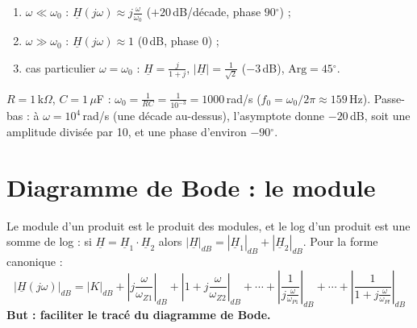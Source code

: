 
\begin{propbox}[title=Asymptotes du passe-haut]
\begin{enumerate}
  \item $\omega\ll\omega_0$ : $\underline H(j\omega)\approx j\frac\omega{\omega_0}$
        ($+20$\,dB/décade, phase $90\ensuremath{^\circ}$) ;
  \item $\omega\gg\omega_0$ : $\underline H(j\omega)\approx 1$ (0\,dB, phase $0$) ;
  \item cas particulier $\omega = \omega_0$ : $\underline H = \frac{j}{1+j}$,
        $|\underline H| = \frac1{\sqrt2}$ ($-3$\,dB), $\mathrm{Arg} = 45\ensuremath{^\circ}$.
\end{enumerate}
\end{propbox}

\begin{exbox}[title={Application numérique (exemple ajouté, pas dans les slides)}]
$R = 1$\,k$\Omega$, $C = 1\,\mu$F : $\omega_0 = \frac1{RC} = \frac1{10^{-3}} = 1000$\,rad/s
($f_0 = \omega_0/2\pi\approx159$\,Hz). Passe-bas : à $\omega = 10^4$\,rad/s (une décade
au-dessus), l'asymptote donne $-20$\,dB, soit une amplitude divisée par 10, et une phase
d'environ $-90\ensuremath{^\circ}$.
\end{exbox}

\section{Diagramme de Bode : le module}


\begin{thmbox}[title=Module d'une fonction de transfert canonique]
Le module d'un produit est le produit des modules, et le log d'un produit est une somme de
log : si $\underline H = \underline H_1\cdot\underline H_2$ alors
$|\underline H|_{dB} = |\underline H_1|_{dB} + |\underline H_2|_{dB}$. Pour la forme
canonique :
\[ |\underline H(j\omega)|_{dB} = |K|_{dB} + \left|j\frac\omega{\omega_{Z1}}\right|_{dB}
   + \left|1 + j\frac\omega{\omega_{Z2}}\right|_{dB} + \cdots
   + \left|\frac1{j\frac\omega{\omega_{P1}}}\right|_{dB} + \cdots
   + \left|\frac1{1 + j\frac\omega{\omega_{Pl}}}\right|_{dB} \]
\textbf{But : faciliter le tracé du diagramme de Bode.}
\end{thmbox}

